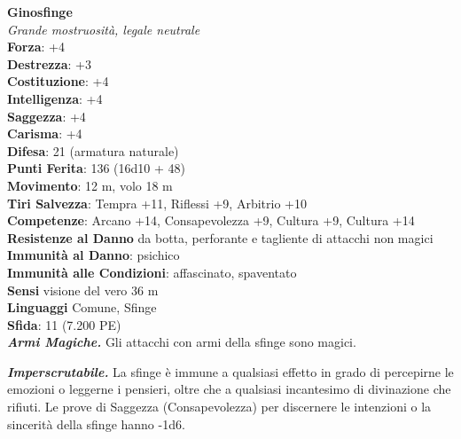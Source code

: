 \begin{multicols}{2}
\medskip\textbf{Ginosfinge}\\
\emph{Grande mostruosità, legale neutrale}\\
\textbf{Forza}: +4\\
\textbf{Destrezza}: +3\\
\textbf{Costituzione}: +4\\
\textbf{Intelligenza}: +4\\
\textbf{Saggezza}: +4\\
\textbf{Carisma}: +4\\
\textbf{Difesa}: 21 (armatura naturale)\\
\textbf{Punti Ferita}: 136 (16d10 + 48)\\
\textbf{Movimento}: 12 m, volo 18 m\\
\textbf{Tiri Salvezza}: Tempra +11, Riflessi +9, Arbitrio +10\\
\textbf{Competenze}: Arcano +14, Consapevolezza +9, Cultura +9, Cultura +14\\
\textbf{Resistenze al Danno} da botta, perforante e tagliente di attacchi non magici\\
\textbf{Immunità al Danno}: psichico\\
\textbf{Immunità alle Condizioni}: affascinato, spaventato\\
\textbf{Sensi} visione del vero 36 m\\
\textbf{Linguaggi} Comune, Sfinge\\
\textbf{Sfida}: 11 (7.200 PE)\smallskip\\
\emph{\textbf{Armi Magiche.}} Gli attacchi con armi della sfinge sono magici.

\emph{\textbf{Imperscrutabile.}} La sfinge è immune a qualsiasi effetto in grado di percepirne le emozioni o leggerne i pensieri, oltre che a qualsiasi incantesimo di divinazione che rifiuti. Le prove di Saggezza (Consapevolezza) per discernere le intenzioni o la sincerità della sfinge
hanno -1d6.\\


\end{multicols}
